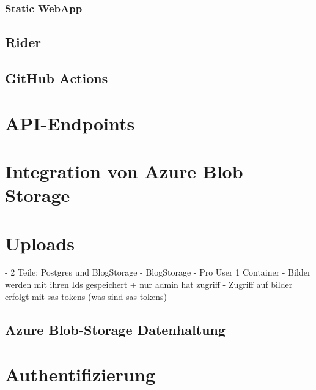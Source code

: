 \subsubsection{Static WebApp}
\label{subsection:azure_static_web_app}

\subsection{Rider}

\subsection{GitHub Actions}

\section{API-Endpoints}

\section{Integration von Azure Blob Storage}

\section{Uploads}



- 2 Teile: Postgres und BlogStorage
- BlogStorage
    - Pro User 1 Container
    - Bilder werden mit ihren Ids gespeichert + nur admin hat zugriff
    - Zugriff auf bilder erfolgt mit sas-tokens (was sind sas tokens)

\subsection{Azure Blob-Storage Datenhaltung}
\label{subsection:azure_blob_storage_datamodel}

\section{Authentifizierung}
